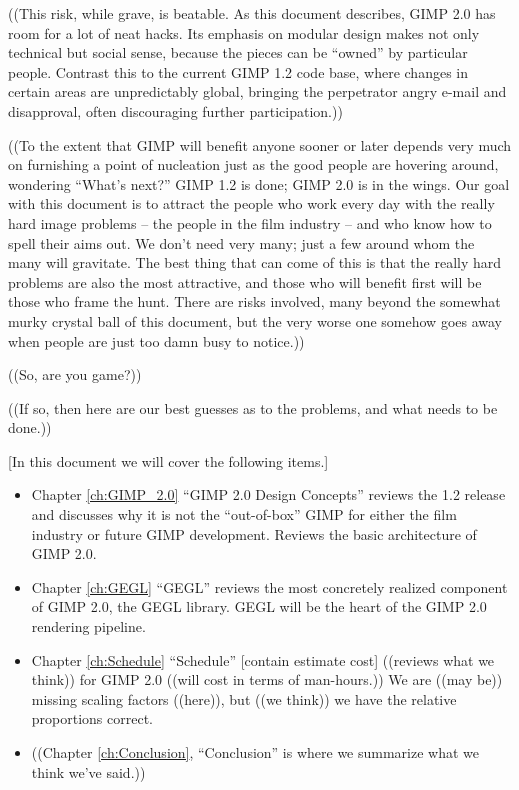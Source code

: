 ((This risk, while grave, is beatable. As this document describes,
GIMP 2.0 has room for a lot of neat hacks. Its emphasis on modular
design makes not only technical but social sense, because
the pieces can be ``owned'' by particular people. Contrast
this to the current GIMP 1.2 code base, where changes in certain 
areas are unpredictably global, bringing the perpetrator angry
e-mail and disapproval, often discouraging further participation.)) 

((To the extent that GIMP will benefit anyone sooner or later depends
very much on furnishing a point of nucleation just as the good people
are hovering around, wondering ``What's next?'' GIMP 1.2 is done; GIMP
2.0 is in the wings. Our goal with this document is to attract the
people who work every day with the really hard image problems -- the
people in the film industry -- and who know how to spell their aims
out. We don't need very many; just a few around whom the many will
gravitate. The best thing that can come of this is that the really
hard problems are also the most attractive, and those who will benefit
first will be those who frame the hunt. There are risks involved, many
beyond the somewhat murky crystal ball of this document, but the very
worse one somehow goes away when people are just too damn busy to
notice.))

((So, are you game?))  

((If so, then here are our best guesses as to the problems,
and what needs to be done.))

[In this document we will cover the following items.]
\begin{itemize}

\item Chapter \ref{ch:GIMP_2.0} ``GIMP 2.0 Design Concepts'' reviews the 1.2 
release and discusses why it is not the ``out-of-box'' GIMP for either
the film industry or future GIMP development.  Reviews the basic architecture 
of GIMP 2.0.

\item Chapter \ref{ch:GEGL} ``GEGL'' reviews the most concretely realized 
component of GIMP 2.0, the GEGL library. GEGL will be the heart of
the GIMP 2.0 rendering pipeline.

\item Chapter \ref{ch:Schedule} ``Schedule'' [contain estimate cost] ((reviews what we think)) for GIMP 2.0
((will cost in terms of man-hours.)) We are ((may be)) missing scaling factors
((here)), but ((we think)) we have the relative proportions correct.

\item ((Chapter \ref{ch:Conclusion}, ``Conclusion'' is where we 
summarize what we think we've said.))

\end{itemize}

